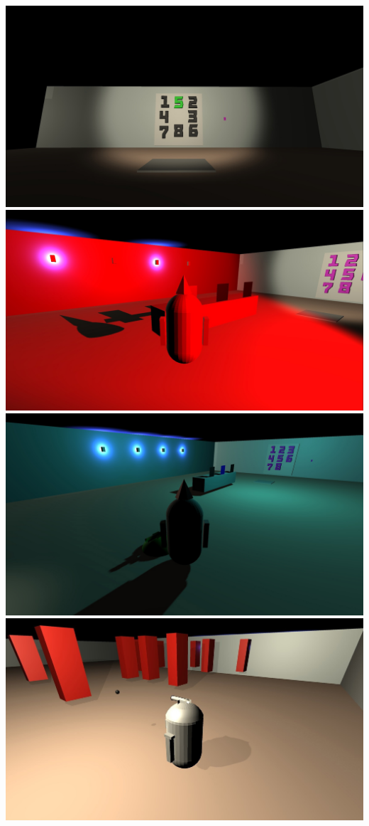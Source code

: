\includegraphics[scale=0.3]{images/25.jpg} \\
\includegraphics[scale=0.3]{images/26.jpg} \\
\includegraphics[scale=0.3]{images/27.jpg} \\
\includegraphics[scale=0.3]{images/28.jpg} \\

